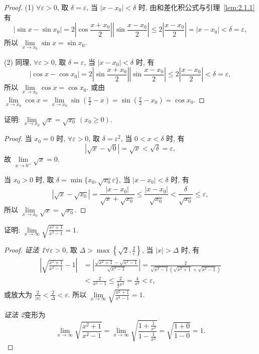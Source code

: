 \begin{proof}
(1) $\forall\varepsilon>0$, 取 $\delta=\varepsilon$, 当 $|x-x_{0}|<\delta$ 时, 由和差化积公式与引理~\ref{lem:2.1.1} 有
\[
|\sin x-\sin x_{0}|=2\left|\cos\frac{x+x_{0}}{2}\right|\left|\sin\frac{x-x_{0}}{2}\right|\leqslant2\left|\frac{x-x_{0}}{2}\right|=|x-x_{0}|<\delta=\varepsilon,
\]
所以 $\lim\limits_{x\to x_0}\sin x=\sin x_0$.

(2) 同理, $\forall\varepsilon>0$, 取 $\delta=\varepsilon$, 当 $|x-x_{0}|<\delta$ 时, 有
\[
|\cos x-\cos x_{0}|=2\left|\sin\frac{x+x_{0}}{2}\right|\left|\sin\frac{x-x_{0}}{2}\right|\leqslant2\left|\frac{x-x_{0}}{2}\right|<\delta=\varepsilon,
\]
所以 $\lim\limits_{x\to x_0}\cos x=\cos x_0$. 或由 $\lim\limits_{x\to x_0}\cos x=\lim\limits_{x\to x_0}\sin\left(\frac{\pi}{2}-x\right)=\sin\left(\frac{\pi}{2}-x_0\right)=\cos x_0$.
\end{proof}

\begin{example}\label{ex:2.1.19}
证明: $\lim\limits_{x\to x_0}\sqrt{x}=\sqrt{x_0}\ (x_0\geqslant0)$.
\end{example}

\begin{proof}
当 $x_{0}=0$ 时, $\forall\varepsilon>0$, 取 $\delta=\varepsilon^{2}$, 当 $0<x<\delta$ 时, 有
\[
|\sqrt{x}-\sqrt{0}|=\sqrt{x}<\sqrt{\delta}=\varepsilon,
\]
故 $\lim\limits_{x\to0^{+}}\sqrt{x}=0$.

当 $x_{0}>0$ 时, 取 $\delta=\min\{x_{0},\sqrt{x_{0}}\varepsilon\}$, 当 $|x-x_{0}|<\delta$ 时, 有
\[
|\sqrt{x}-\sqrt{x_{0}}|=\frac{|x-x_{0}|}{\sqrt{x}+\sqrt{x_{0}}}\leqslant\frac{|x-x_{0}|}{\sqrt{x_{0}}}<\frac{\delta}{\sqrt{x_{0}}}\leqslant\varepsilon,
\]
所以 $\lim\limits_{x\to x_0}\sqrt{x}=\sqrt{x_0}$.
\end{proof}

\begin{example}\label{ex:2.1.20}
证明: $\lim\limits_{x\to\infty}\sqrt{\frac{x^{2}+1}{x^{2}-1}}=1$.
\end{example}

\begin{proof}
\textit{证法 1}\quad $\forall\varepsilon>0$, 取 $\Delta>\max\left\{\sqrt{2},\frac{2}{\varepsilon}\right\}$, 当 $|x|>\Delta$ 时, 有
\begin{align*}
\left|\sqrt{\frac{x^2+1}{x^2-1}}-1\right| &= \left|\frac{\sqrt{x^2+1}-\sqrt{x^2-1}}{\sqrt{x^2-1}}\right|=\frac{2}{\sqrt{x^2-1}(\sqrt{x^2+1}+\sqrt{x^2-1})} \\
&< \frac{2}{x^2-1} \leqslant \frac{2}{\frac{1}{2}x^2} = \frac{4}{x^2} < \varepsilon,
\end{align*}
或放大为 $\frac{2}{|x|} < \frac{2}{\Delta} < \varepsilon$. 所以 $\lim\limits_{x\to\infty}\sqrt{\frac{x^{2}+1}{x^{2}-1}}=1$.

\textit{证法 2}\quad 变形为
\[
\lim_{x\to\infty}\sqrt{\frac{x^{2}+1}{x^{2}-1}}=\lim_{x\to\infty}\sqrt{\frac{1+\frac{1}{x^{2}}}{1-\frac{1}{x^{2}}}}=\sqrt{\frac{1+0}{1-0}}=1.
\]
\end{proof}

